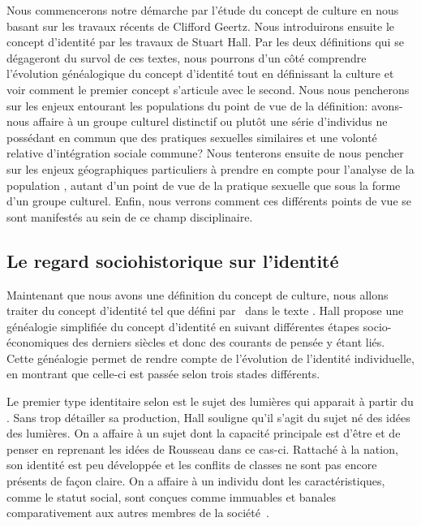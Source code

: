 Nous commencerons notre démarche par l'étude du concept de culture en nous basant sur les travaux récents de Clifford Geertz. 
Nous introduirons ensuite le concept d'identité par les travaux de Stuart Hall. 
Par les deux définitions qui se dégageront du survol de ces textes, nous pourrons d'un côté comprendre l'évolution généalogique du concept d'identité tout en définissant la culture et voir comment le premier concept s'articule avec le second. 
Nous nous pencherons sur les enjeux entourant les populations \lgbt{} du point de vue de la définition: avons-nous affaire à un groupe culturel distinctif ou plutôt une série d'individus ne possédant en commun que des pratiques sexuelles similaires et une volonté relative d'intégration sociale commune? 
Nous tenterons ensuite de nous pencher sur les enjeux géographiques particuliers à prendre en compte pour l'analyse de la population \lgbt{}, autant d'un point de vue de la pratique sexuelle que sous la forme d'un groupe culturel. 
Enfin, nous verrons comment ces différents points de vue se sont manifestés au sein de ce champ disciplinaire.


\subsection{Le regard sociohistorique sur l'identité}
\label{sec:le_regard_sociohistoirique_sur_l_identit_} Maintenant que nous avons une définition du concept de culture, nous allons traiter du concept d'identité tel que défini par~\citet{Hall1996a} dans le texte . 
Hall propose une généalogie simplifiée du concept d'identité en suivant différentes étapes socio-économiques des derniers siècles et donc des courants de pensée y étant liés. 
Cette généalogie permet de rendre compte de l'évolution de l'identité individuelle, en montrant que celle-ci est passée selon trois stades différents.

Le premier type identitaire selon \citeauthor{Hall1996a} est le sujet des lumières qui apparait à partir du . 
Sans trop détailler sa production, Hall souligne qu'il s'agit du sujet né des idées des lumières. 
On a affaire à un sujet dont la capacité principale est d'être et de penser en reprenant les idées de Rousseau dans ce cas-ci. 
Rattaché à la nation, son identité est peu développée et les conflits de classes ne sont pas encore présents de façon claire. 
On a affaire à un individu dont les caractéristiques, comme le statut social, sont conçues comme immuables et banales comparativement aux autres membres de la société~\citeyearpar[596]{Hall1996a}.

